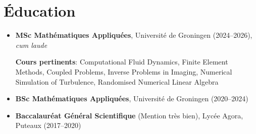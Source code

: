 \section*{Éducation}
\begin{itemize}
    \item \textbf{MSc Mathématiques Appliquées}, Université de Groningen
    (2024--2026), \textit{cum laude} 

    \textbf{Cours pertinents}: Computational Fluid Dynamics, Finite Element
    Methods, Coupled Problems, Inverse Problems in Imaging, Numerical Simulation
    of Turbulence, Randomised Numerical Linear Algebra
    \item \textbf{BSc Mathématiques Appliquées}, Université de Groningen
    (2020--2024) 
 
    \item \textbf{Baccalauréat Général Scientifique} (Mention très bien), Lycée
    Agora, Puteaux (2017--2020)
\end{itemize}